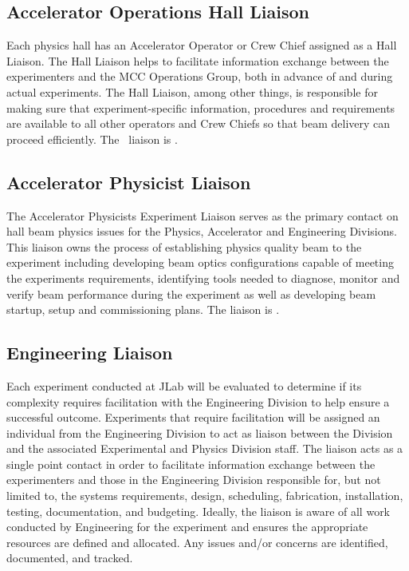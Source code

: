 \documentclass[10pt]{article}
\begin{document}
\subsection{Accelerator Operations Hall Liaison}

Each physics hall has an Accelerator Operator or Crew Chief assigned as a Hall Liaison.
The Hall Liaison helps to facilitate information exchange between the
experimenters and the MCC Operations Group, both in advance of and during
actual experiments. The Hall Liaison, among other things, is responsible
for making sure that experiment-specific information, procedures and requirements
are available to all other operators and Crew Chiefs so that beam delivery can proceed efficiently.  The \HALL\ liaison is {\AccOpsLiaison}.

\subsection{Accelerator Physicist Liaison}

The Accelerator Physicists Experiment Liaison serves as the primary contact on hall beam physics issues
for the Physics, Accelerator and Engineering Divisions. This liaison owns the process of establishing
physics quality beam to the experiment including developing beam optics configurations capable of
meeting the experiments requirements, identifying tools needed to diagnose, monitor and verify
beam performance during the experiment as well as developing beam startup, setup and commissioning
plans. The {\HALL} liaison is {\AccPhysLiaison}.


\subsection{Engineering Liaison}

Each experiment conducted at JLab will be evaluated to determine if its complexity requires facilitation
with the Engineering Division to help ensure a successful outcome.  Experiments that require
facilitation will be assigned an individual from the Engineering Division to act as liaison
between the Division and the associated Experimental and Physics Division staff. The liaison
acts as a single point contact in order to facilitate information exchange
between the experimenters and those in the Engineering Division responsible for,
but not limited to, the systems requirements, design, scheduling, fabrication,
installation, testing, documentation, and budgeting. Ideally, the liaison
is aware of all work conducted by Engineering for the experiment and ensures
the appropriate resources are defined and allocated. Any issues and/or concerns are identified,
documented, and tracked.
\end{document}

